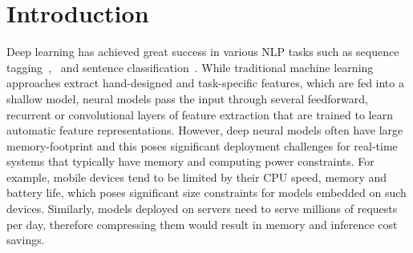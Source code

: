 \section{Introduction}\label{intro}

Deep learning has achieved great success in various NLP tasks such as sequence tagging~\cite{chung_rnn},~\cite{ma_hovy_2016} and sentence classification~\cite{liu_multi_timescale,conv_text_kim}.
While traditional machine learning approaches
extract hand-designed and task-specific features, which are fed into a shallow
model, neural models pass the input through several feedforward, recurrent or
convolutional layers of feature extraction that are trained to learn
automatic feature representations. However, deep neural models often have
large memory-footprint and this poses significant deployment challenges for
real-time systems that typically have memory and computing power constraints. For
example, mobile devices tend to be limited by their CPU speed, memory and
battery life, which poses significant size constraints for models embedded on
such devices. Similarly, models deployed on servers need to serve millions of
requests per day, therefore compressing them would result in memory and
inference cost savings. 

